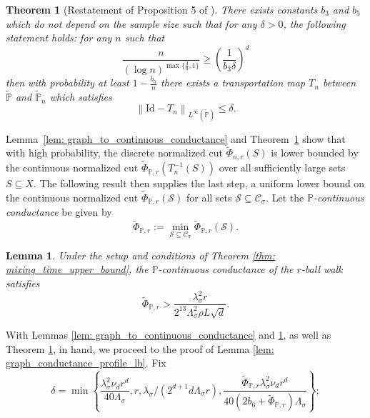 \documentclass[11pt,twoside]{article}
\newtheorem{theorem}{Theorem}
\newtheorem{lemma}{Lemma}
\theoremstyle{definition}
\newcommand{\set}[1]{\left\{#1\right\}}
\newcommand{\norm}[1]{\left\lVert#1\right\rVert}
\newcommand{\1}{\mathbbm{1}}
\newcommand{\Xbf}{X}
\newcommand{\Pbb}{\mathbb{P}}
\newcommand{\Sset}{\mathcal{S}}
\newcommand{\Cset}{\mathcal{C}}
\newcommand{\Csig}{\Cset_{\sigma}}
\begin{document}
\begin{theorem}[Restatement of Proposition 5 of \cite{garciatrillos16}]
	\label{thm: stagnating_transportation_maps}
	There exists constants $b_3$ and $b_5$ which do not depend on the sample size such that for any $\delta > 0$, the following statement holds: for any $n$ such that
	\begin{equation*}
	\frac{n}{(\log n)^{\max\{\frac{3}{d},1\}}} \geq \left(\frac{1}{b_3\delta}\right)^{d}
	\end{equation*}
	then with probability at least $1 - \frac{b_5}{n}$ there exists a transportation map $T_n$ between $\widetilde{\Pbb}$ and $\widetilde{\Pbb}_n$
	which satisfies
	\begin{equation*}
	\norm{\mathrm{Id} - T_n}_{L^{\infty}(\widetilde{\Pbb})} \leq \delta.
	\end{equation*}
\end{theorem}
Lemma~\ref{lem: graph_to_continuous_conductance} and Theorem~\ref{thm: stagnating_transportation_maps} show that with high probability, the discrete normalized cut $\widetilde{\Phi}_{n,r}(S)$ is lower bounded by the continuous normalized cut $\widetilde{\Phi}_{\Pbb,r}(T_n^{-1}(S))$ over all sufficiently large sets $S \subseteq \Xbf$. The following result then supplies the last step, a uniform lower bound on the continuous normalized cut $\widetilde{\Phi}_{\Pbb,r}(\Sset)$ for all sets $\Sset \subseteq \Csig$. Let the \emph{$\Pbb$-continuous conductance} be given by
\begin{equation*}
\widetilde{\Phi}_{\Pbb,r} := \min_{\Sset \subseteq \Csig} \widetilde{\Phi}_{\Pbb,r}(\Sset).
\end{equation*} 
\begin{lemma}
	\label{lem: nonuniform_continuous_conductance}
	Under the setup and conditions of Theorem \ref{thm: mixing_time_upper_bound}, the $\Pbb$-continuous conductance of the $r$-ball walk satisfies
	\begin{equation*}
	\widetilde{\Phi}_{\Pbb,r} > \frac{\lambda_{\sigma}^2 r}{2^{13} \Lambda_{\sigma}^2 \rho L \sqrt{d}}.
	\end{equation*}
\end{lemma}
With Lemmas \ref{lem: graph_to_continuous_conductance} and \ref{lem: nonuniform_continuous_conductance}, as well as Theorem \ref{thm: stagnating_transportation_maps}, in hand, we proceed to the proof of Lemma \ref{lem: graph_conductance_profile_lb}. Fix
\begin{equation*}
\delta = \min\set{\frac{\lambda_{\sigma}^2\nu_dr^d}{40\Lambda_{\sigma}},r, \lambda_{\sigma}/(2^{d+1}d\Lambda_{\sigma}r),\frac{\widetilde{\Phi}_{\Pbb,r} \lambda_{\sigma}^2\nu_dr^d}{40(2b_6 + \widetilde{\Phi}_{\Pbb,r}) \Lambda_{\sigma}}};
\end{equation*}
\end{document}
